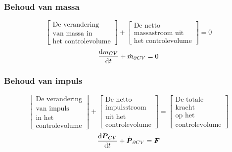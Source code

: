 \documentclass[t]{beamer}
\begin{document}
		\begin{frame}
			\frametitle{Behoud van massa}
			\vspace{1cm}
			\begin{equation*}
				\left[
					\begin{array}{c}
						\mbox{De verandering} \\ \mbox{van massa in} \\ \mbox{het controlevolume}
					\end{array}
				\right]
				+
				\left[
					\begin{array}{c}
						\mbox{De netto} \\ \mbox{massastroom uit} \\ \mbox{het controlevolume}
					\end{array}
				\right]
				= 0
				\label{eqn:controlevolume,behoud van massa,woorden}
			\end{equation*}
			\vspace{1cm}
			\pause
			\begin{equation}
				\frac{\mathrm{d} m_{CV}}{\mathrm{d} t} + \dot{m}_{\partial CV} = 0
				\label{eqn:controlevolume,behoud van massa}
			\end{equation}
		\end{frame}	
  		\begin{frame}
			\frametitle{Behoud van impuls}
			\vspace{0.7cm}
			\begin{equation*}
				\left[
					\begin{array}{c}
						\mbox{De verandering} \\ \mbox{van impuls} \\ \mbox{in het}  \\ \mbox{controlevolume}
					\end{array}
				\right]
				+
				\left[
					\begin{array}{c}
						\mbox{De netto} \\ \mbox{impulsstroom} \\ \mbox{uit het} \\ \mbox{controlevolume}
					\end{array}
				\right]
				=
				\left[
					\begin{array}{c}
						\mbox{De totale} \\ \mbox{kracht} \\ \mbox{op het} \\ \mbox{controlevolume}
					\end{array}
				\right]
				\label{eqn:controlevolume,behoud van impuls,woorden}
			\end{equation*}
			\vspace{1cm}
			\pause
			\begin{equation}
				\frac{\mathrm{d} \boldsymbol{P}_{CV}}{\mathrm{d} t} + \dot{\boldsymbol{P}}_{\partial CV} =  \boldsymbol{F}
				\label{eqn:controlevolume,behoud van impuls}
			\end{equation}
		\end{frame}	
\end{document}
